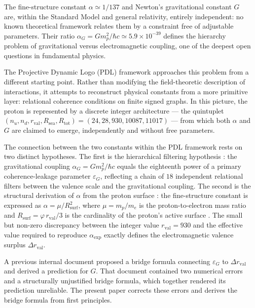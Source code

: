 \documentclass[11pt,a4paper]{article}
\begin{document}
The fine-structure constant $\alpha \simeq 1/137$ and Newton's gravitational constant $G$ are, within the Standard Model and general relativity, entirely independent: no known theoretical framework relates them by a constraint free of adjustable parameters. Their ratio $\alpha_G = Gm_p^2/\hbar c \simeq 5.9 \times 10^{-39}$ defines the hierarchy problem of gravitational versus electromagnetic coupling, one of the deepest open questions in fundamental physics.

The Projective Dynamic Logo (PDL) framework \cite{PDL_D1_2026} approaches this problem from a different starting point. Rather than modifying the field-theoretic description of interactions, it attempts to reconstruct physical constants from a more primitive layer: relational coherence conditions on finite signed graphs. In this picture, the proton is represented by a discrete integer architecture --- the quintuplet $(n_u, n_d, r_{\mathrm{val}}, R_{\mathrm{sea}}, R_{\mathrm{tot}}) = (24, 28, 930, 10087, 11017)$ \cite{Combinatorial_Proton_v2_2026} --- from which both $\alpha$ and $G$ are claimed to emerge, independently and without free parameters.

The connection between the two constants within the PDL framework rests on two distinct hypotheses. The first is the hierarchical filtering hypothesis \cite{Exponent_18_PDL_2026}: the gravitational coupling $\alpha_G = Gm_p^2/\hbar c$ equals the eighteenth power of a primary coherence-leakage parameter $\varepsilon_G$, reflecting a chain of $18$ independent relational filters between the valence scale and the gravitational coupling. The second is the structural derivation of $\alpha$ from the proton surface \cite{Alpha_PDL_2026}: the fine-structure constant is expressed as $\alpha = \mu/R_{\mathrm{surf}}^2$, where $\mu = m_p/m_e$ is the proton-to-electron mass ratio and $R_{\mathrm{surf}} = \varphi\,r_{\mathrm{val}}/3$ is the cardinality of the proton's active surface \cite{Golden_Ratio_PDL_2026}. The small but non-zero discrepancy between the integer value $r_{\mathrm{val}} = 930$ and the effective value required to reproduce $\alpha_{\exp}$ exactly defines the electromagnetic valence surplus $\Delta r_{\mathrm{val}}$.

A previous internal document \cite{Universal_Coherence_Leakage_2026} proposed a bridge formula connecting $\varepsilon_G$ to $\Delta r_{\mathrm{val}}$ and derived a prediction for $G$. That document contained two numerical errors and a structurally unjustified bridge formula, which together rendered its prediction unreliable. The present paper corrects these errors and derives the bridge formula from first principles.
\end{document}
